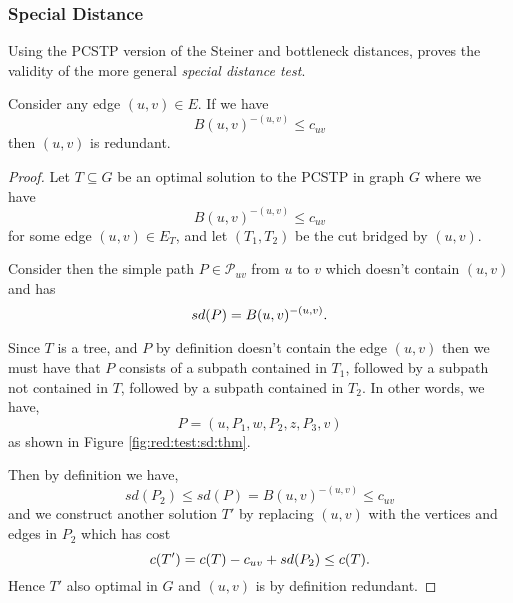  \subsubsection{Special Distance}
 \label{sec:red:test:sd}
 Using the PCSTP version of the Steiner and bottleneck distances, \cite{uchoa2006reduction} proves
  the validity of the more general \textit{special distance test}.
 \begin{theorem}
 Consider any edge $(u,v) \in E$. If we have
 $$B(u,v)^{-(u,v)} \leq c_{uv}$$
 then $(u,v)$ is redundant.
\end{theorem}
 \begin{proof}
   Let $T  \subseteq G$ be an optimal solution to the PCSTP in graph $G$
   where we have
   $$B(u,v)^{-(u,v)} \leq c_{uv}$$
   for some edge $(u,v) \in E_T$, and let $(T_1, T_2)$ be the cut bridged
   by $(u,v)$.

   Consider then the simple path $P \in \mathcal{P}_{uv}$ from $u$ to $v$ which doesn't
    contain $(u,v)$ and has
   $$sd(P) = B(u,v)^{-(u,v)}\mathnormal{.}$$

   Since $T$ is a tree, and $P$ by definition doesn't contain the edge $(u,v)$
   then we must have that $P$ consists of a subpath contained in $T_1$, followed by
   a subpath not contained in $T$, followed by a subpath contained in $T_2$.
   In other words, we have,
   $$P = (u, P_1, w, P_2, z, P_3, v)$$
   as shown in Figure \ref{fig:red:test:sd:thm}.

   Then by definition we have,
   $$sd(P_2) \leq sd(P) = B(u,v)^{-(u,v)} \leq c_{uv}$$
   and we construct another solution $T'$ by replacing $(u,v)$ with the
   vertices and edges in $P_2$ which has cost
   $$c(T') = c(T) - c_{uv} + sd(P_2) \leq c(T)\mathnormal{.}$$
   Hence $T'$ also optimal in $G$ and $(u,v)$ is by definition redundant.
\end{proof}
